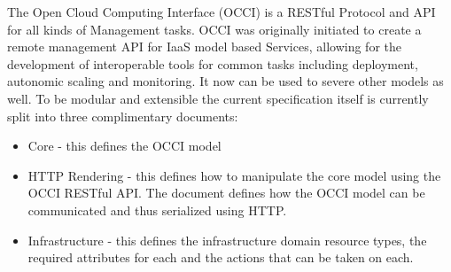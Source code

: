 The Open Cloud Computing Interface (OCCI) is a RESTful Protocol and
API for all kinds of Management tasks. OCCI was originally initiated
to create a remote management API for IaaS model based Services,
allowing for the development of interoperable tools for common tasks
including deployment, autonomic scaling and monitoring. It now can be
used to severe other models as well. To be modular and extensible the
current specification itself is currently split into three
complimentary documents:

\begin{itemize}
\item Core - this defines the OCCI model
\item HTTP Rendering - this defines how to manipulate the core model
  using the OCCI RESTful API. The document defines how the OCCI model
  can be communicated and thus serialized using HTTP.
\item Infrastructure - this defines the infrastructure domain resource
  types, the required attributes for each and the actions that can be
  taken on each.
\end{itemize}
